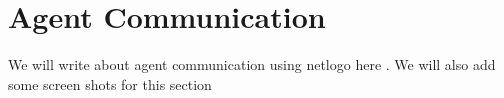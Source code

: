 \section{Agent Communication}

We will write about agent communication using netlogo here .
We will also add some screen shots for this section 

